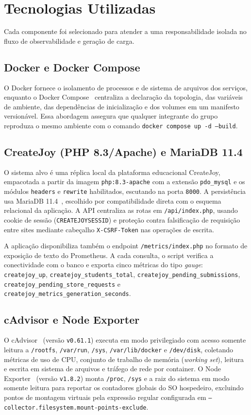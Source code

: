 \documentclass[conference]{IEEEtran}
\begin{document}
\section{Tecnologias Utilizadas}

Cada componente foi selecionado para atender a uma responsabilidade isolada no fluxo de observabilidade e geração de carga.

\subsection{Docker e Docker Compose}
O Docker fornece o isolamento de processos e de sistema de arquivos dos serviços, enquanto o Docker Compose~\cite{dockercompose} centraliza a declaração da topologia, das variáveis de ambiente, das dependências de inicialização e dos volumes em um manifesto versionável. Essa abordagem assegura que qualquer integrante do grupo reproduza o mesmo ambiente com o comando \texttt{docker compose up -d --build}.

\subsection{CreateJoy (PHP 8.3/Apache) e MariaDB 11.4}
O sistema alvo é uma réplica local da plataforma educacional CreateJoy, empacotada a partir da imagem \texttt{php:8.3-apache} com a extensão \texttt{pdo\_mysql} e os módulos \texttt{headers} e \texttt{rewrite} habilitados, escutando na porta \texttt{8000}. A persistência usa MariaDB 11.4~\cite{mariadb}, escolhido por compatibilidade direta com o esquema relacional da aplicação. A API centraliza as rotas em \texttt{/api/index.php}, usando cookie de sessão (\texttt{CREATEJOYSESSID}) e proteção contra falsificação de requisição entre sites mediante cabeçalho \texttt{X-CSRF-Token} nas operações de escrita.

A aplicação disponibiliza também o endpoint \texttt{/metrics/index.php} no formato de exposição de texto do Prometheus. A cada consulta, o script verifica a conectividade com o banco e exporta cinco métricas do tipo \textit{gauge}: \texttt{createjoy\_up}, \texttt{createjoy\_students\_total}, \texttt{createjoy\_pending\_submissions}, \texttt{createjoy\_pending\_store\_requests} e \texttt{createjoy\_metrics\_generation\_seconds}.

\subsection{cAdvisor e Node Exporter}
O cAdvisor~\cite{cadvisor} (versão \texttt{v0.61.1}) executa em modo privilegiado com acesso somente leitura a \texttt{/rootfs}, \texttt{/var/run}, \texttt{/sys}, \texttt{/var/lib/docker} e \texttt{/dev/disk}, coletando métricas de uso de CPU, conjunto de trabalho de memória (\textit{working set}), leitura e escrita em sistema de arquivos e tráfego de rede por container. O Node Exporter~\cite{nodeexporter} (versão \texttt{v1.8.2}) monta \texttt{/proc}, \texttt{/sys} e a raiz do sistema em modo somente leitura para reportar os contadores globais do SO hospedeiro, excluindo pontos de montagem virtuais pela expressão regular configurada em \texttt{--collector.filesystem.mount-points-exclude}.
\end{document}
